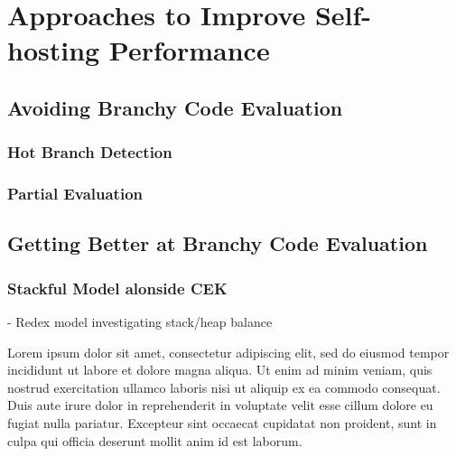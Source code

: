 \chapter{Approaches to Improve Self-hosting Performance}
	\section{Avoiding Branchy Code Evaluation}
		\subsection{Hot Branch Detection}
		\subsection{Partial Evaluation}
	\section{Getting Better at Branchy Code Evaluation}
		\subsection{Stackful Model alonside CEK}
		- Redex model investigating stack/heap balance

Lorem ipsum dolor sit amet, consectetur adipiscing elit, sed do eiusmod tempor incididunt ut labore et dolore magna aliqua. Ut enim ad minim veniam, quis nostrud exercitation ullamco laboris nisi ut aliquip ex ea commodo consequat. Duis aute irure dolor in reprehenderit in voluptate velit esse cillum dolore eu fugiat nulla pariatur. Excepteur sint occaecat cupidatat non proident, sunt in culpa qui officia deserunt mollit anim id est laborum.
